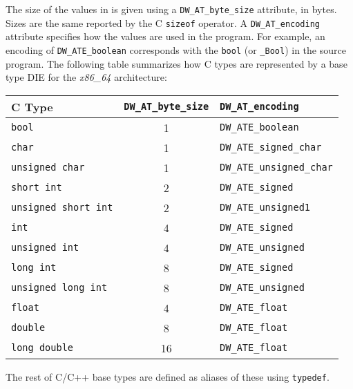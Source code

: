 The size of the values in is given using a \verb|DW_AT_byte_size| attribute,
in bytes. Sizes are the same reported by the C \texttt{sizeof}
operator. A \verb|DW_AT_encoding| attribute specifies how the values are
used in the program. For example, an encoding of \verb|DW_ATE_boolean|
corresponds with the \texttt{bool} (or \texttt{_Bool}) in the
source program. The following table summarizes how C types are represented by
a base type DIE for the \textit{x86\_64} architecture:

\begin{center}
  \begin{tabular}{lcl}
    \toprule
    C Type & \verb|DW_AT_byte_size| & \verb|DW_AT_encoding| \\
    \midrule
    \texttt{bool}               & 1 & \verb|DW_ATE_boolean| \\
    \texttt{char}               & 1 & \verb|DW_ATE_signed_char| \\
    \texttt{unsigned char}      & 1 & \verb|DW_ATE_unsigned_char| \\
    \texttt{short int}          & 2 & \verb|DW_ATE_signed| \\
    \texttt{unsigned short int} & 2 & \verb|DW_ATE_unsigned1| \\
    \texttt{int}                & 4 & \verb|DW_ATE_signed| \\
    \texttt{unsigned int}       & 4 & \verb|DW_ATE_unsigned| \\
    \texttt{long int}           & 8 & \verb|DW_ATE_signed| \\
    \texttt{unsigned long int}  & 8 & \verb|DW_ATE_unsigned| \\
    \texttt{float}              & 4 & \verb|DW_ATE_float| \\
    \texttt{double}             & 8 & \verb|DW_ATE_float| \\
    \texttt{long double}        & 16& \verb|DW_ATE_float| \\
    \bottomrule
  \end{tabular}
\end{center}

The rest of C/C++ base types are defined as aliases of these
using \texttt{typedef}.



